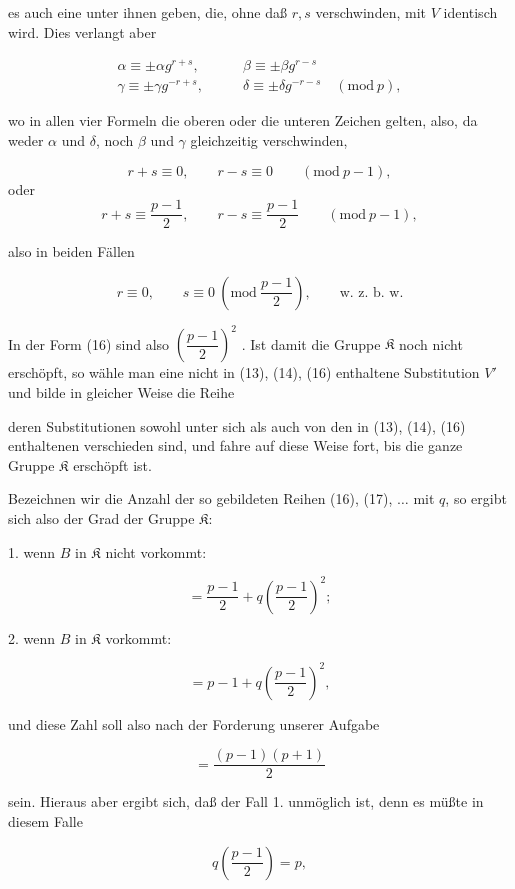 
es auch eine unter ihnen geben, die, ohne daß $r, s$ verschwinden, mit $V$ identisch wird. Dies verlangt aber

\begin{align*}
\alpha\equiv\pm\alpha g^{r+s}, &\qquad \beta\equiv\pm\beta g^{r-s}\\
\gamma\equiv\pm\gamma g^{-r+s}, &\qquad \delta\equiv\pm\delta g^{-r-s}\quad(\mathrm{mod}\ p),
\end{align*}

wo in allen vier Formeln die oberen oder die unteren Zeichen gelten, also, da weder $\alpha$ und $\delta$, noch $\beta$ und $\gamma$ gleichzeitig verschwinden,

\[ r+s\equiv 0,\qquad r-s\equiv 0\qquad(\mathrm{mod}\ p-1), \]
oder
\[ r+s\equiv\frac{p-1}{2},\qquad r-s\equiv\frac{p-1}{2}\qquad(\mathrm{mod}\ p-1), \]

also in beiden Fällen

\[ r\equiv 0,\qquad s\equiv 0\ \left(\mathrm{mod}\ \frac{p-1}{2}\right),\qquad\text{w. z. b. w.} \]

In der Form (16) sind also $\left(\dfrac{p-1}{2}\right)^2$ . Ist damit die Gruppe $\mathfrak{K}$ noch nicht erschöpft, so wähle man eine nicht in (13), (14), (16) enthaltene Substitution $V'$ und bilde in gleicher Weise die Reihe


deren Substitutionen sowohl unter sich als auch von den in (13), (14), (16) enthaltenen verschieden sind, und fahre auf diese Weise fort, bis die ganze Gruppe $\mathfrak{K}$ erschöpft ist.

Bezeichnen wir die Anzahl der so gebildeten Reihen (16), (17), $\dots$ mit $q$, so ergibt sich also der Grad der Gruppe $\mathfrak{K}$:

1. wenn $B$ in $\mathfrak{K}$ nicht vorkommt:

\[ =\frac{p-1}{2}+q\left(\frac{p-1}{2}\right)^2; \]

2. wenn $B$ in $\mathfrak{K}$ vorkommt:

\[ =p-1+q\left(\frac{p-1}{2}\right)^2, \]

und diese Zahl soll also nach der Forderung unserer Aufgabe

\[ =\frac{(p-1)(p+1)}{2} \]

sein. Hieraus aber ergibt sich, daß der Fall 1. unmöglich ist, denn es müßte in diesem Falle

\[ q\left(\frac{p-1}{2}\right)=p, \]
